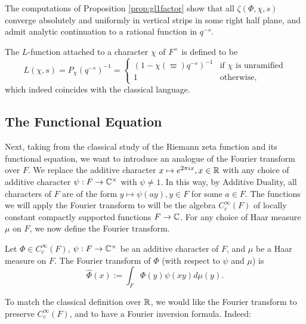 \begin{rem}
    The computations of Proposition \ref{prop:gl1factor} show that all $\zeta(\Phi,\chi,s)$ converge absolutely and uniformly in vertical strips in some right half plane, and admit analytic continuation to a rational function in $q^{-s}$.
\end{rem}

\begin{defn}\label{def:lfunction}
    The $L$-function attached to a character $\chi$ of $F^\times$ is defined to be
    \begin{equation*}
        L(\chi,s)=P_\chi(q^{-s})^{-1}=
        \begin{cases}
            (1-\chi(\varpi)q^{-s})^{-1} & \text{if $\chi$ is unramified} \\
            1 & \text{otherwise},
        \end{cases}
    \end{equation*}
    which indeed coincides with the classical language.
\end{defn}

\subsection{The Functional Equation}

Next, taking from the classical study of the Riemann zeta function and its functional equation, we want to introduce an analogue of the Fourier transform over $F$. We replace the additive character $x\mapsto e^{2\pi i x},x\in\mathbb{R}$ with any choice of additive character $\psi: F \to \mathbb{C}^\times$ with $\psi \neq 1$. In this way, by Additive Duality, all characters of $F$ are of the form $y\mapsto\psi(ay),y\in F$ for some $a\in F$. The functions we will apply the Fourier transform to will be the algebra $C_c^\infty(F)$ of locally constant compactly supported functions $F \to \mathbb{C}$. For any choice of Haar measure $\mu$ on $F$, we now define the Fourier transform.

\begin{defn}
    Let $\Phi \in C_c^\infty(F)$, $\psi:F \to \mathbb{C}^\times$ be an additive character of $F$, and $\mu$ be a Haar measure on $F$. The Fourier transform of $\Phi$ (with respect to $\psi$ and $\mu$) is 
    $$\hat{\Phi}(x) := \int_F \Phi(y)\psi(xy) d\mu(y).$$
\end{defn}

To match the classical definition over $\mathbb{R}$, we would like the Fourier transform to preserve $C_c^\infty(F)$, and to have a Fourier inversion formula. Indeed:

